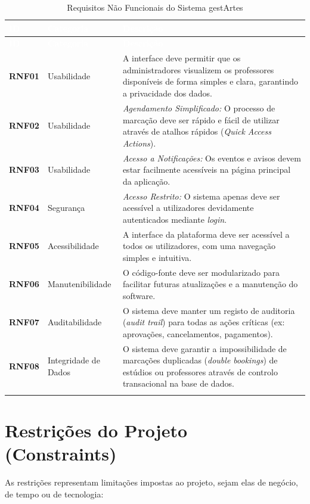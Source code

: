 \documentclass[12pt,a4paper]{report}
\begin{document}
\begin{longtable}{@{}p{} | p{} | p{}@{}}
\toprule
\rowcolor{headerblue} 
\textbf{\textcolor{white}{ID}} & \textbf{\textcolor{white}{Categoria}} & \textbf{\textcolor{white}{Descrição}} \\ \midrule
\endfirsthead

\toprule
\rowcolor{headerblue} 
\textbf{\textcolor{white}{ID}} & \textbf{\textcolor{white}{Categoria}} & \textbf{\textcolor{white}{Descrição}} \\ \midrule
\endhead

\textbf{RNF01} & Usabilidade & A interface deve permitir que os administradores visualizem os professores disponíveis de forma simples e clara, garantindo a privacidade dos dados. \\ \midrule
\textbf{RNF02} & Usabilidade & \textit{Agendamento Simplificado:} O processo de marcação deve ser rápido e fácil de utilizar através de atalhos rápidos (\textit{Quick Access Actions}). \\ \midrule
\textbf{RNF03} & Usabilidade & \textit{Acesso a Notificações:} Os eventos e avisos devem estar facilmente acessíveis na página principal da aplicação. \\ \midrule
\textbf{RNF04} & Segurança & \textit{Acesso Restrito:} O sistema apenas deve ser acessível a utilizadores devidamente autenticados mediante \textit{login}. \\ \midrule
\textbf{RNF05} & Acessibilidade & A interface da plataforma deve ser acessível a todos os utilizadores, com uma navegação simples e intuitiva. \\ \midrule
\textbf{RNF06} & Manutenibilidade & O código-fonte deve ser modularizado para facilitar futuras atualizações e a manutenção do software. \\ \midrule
\textbf{RNF07} & Auditabilidade & O sistema deve manter um registo de auditoria (\textit{audit trail}) para todas as ações críticas (ex: aprovações, cancelamentos, pagamentos). \\ \midrule
\textbf{RNF08} & Integridade de Dados & O sistema deve garantir a impossibilidade de marcações duplicadas (\textit{double bookings}) de estúdios ou professores através de controlo transacional na base de dados. \\ \bottomrule
\caption{Requisitos Não Funcionais do Sistema gestArtes}
\end{longtable}

\section{Restrições do Projeto (Constraints)}
As restrições representam limitações impostas ao projeto, sejam elas de negócio, de tempo ou de tecnologia:
\end{document}

